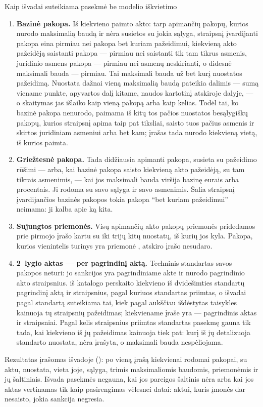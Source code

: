 \begin{codebox}{Kaip išvadai suteikiama pasekmė be modelio iškvietimo}
\begin{enumerate}
    tada, kai tas kitas aktas yra tarp aktų, kuriuos ši ataskaita vertina šiai įmonei. Iš kelių
    tokių aktų imamas tas, kurio maksimali bauda didžiausia.
  \item \textbf{Bazinė pakopa.} Iš kiekvieno paimto akto: tarp apimančių pakopų, kurios nurodo
    maksimalią baudą ir nėra susietos su jokia sąlyga, straipsnį įvardijanti pakopa eina pirmiau
    nei pakopa bet kuriam pažeidimui, kiekvieną akto pažeidėją saistanti pakopa --- pirmiau nei
    saistanti tik tam tikrus asmenis, juridinio asmens pakopa --- pirmiau nei asmenų neskirianti, o
    didesnė maksimali bauda --- pirmiau. Tai maksimali bauda už bet kurį nuostatos pažeidimą.
    Nuostata dažnai vieną maksimalią baudą pateikia dalimis --- sumą viename punkte, apyvartos
    dalį kitame, naudos kartotinį atskiroje dalyje, --- o skaitymas jas išlaiko kaip vieną
    pakopą arba kaip kelias. Todėl tai, ko bazinė pakopa nenurodo, paimama iš kitų tos pačios
    nuostatos besąlygiškų pakopų, kurios straipsnį apima taip pat tiksliai, saisto tuos pačius
    asmenis ir skirtos juridiniam asmeniui arba bet kam; įrašas tada nurodo kiekvieną vietą, iš
    kurios paimta.
  \item \textbf{Griežtesnė pakopa.} Tada didžiausia apimanti pakopa, susieta su pažeidimo
    rūšimi --- arba, kai bazinė pakopa saisto kiekvieną akto pažeidėją, su tam tikrais asmenimis,
    --- kai jos maksimali bauda viršija bazinę eurais arba procentais. Ji rodoma su savo sąlyga
    ir savo asmenimis. Šalia straipsnį įvardijančios bazinės pakopos tokia pakopa \enquote{bet
    kuriam pažeidimui} neimama: ji kalba apie ką kita.
  \item \textbf{Sujungtos priemonės.} Visų apimančių akto pakopų priemonės pridedamos prie
    pirmojo įrašo kartu su iki trijų kitų nuostatų, iš kurių jos kyla. Pakopa, kurios vienintelis
    turinys yra priemonė , atskiro įrašo nesudaro.
  \item \textbf{2~lygio aktas --- per pagrindinį aktą.} Techninis standartas savos pakopos
    neturi: jo sankcijos yra pagrindiniame akte ir nurodo pagrindinio akto straipsnius.
     iš katalogo perskaito kiekvieno iš dvidešimties standartų pagrindinį
    aktą ir straipsnius, pagal kuriuos standartas priimtas, o išvadai pagal standartą
    suteikiama tai, kiek pagal aukščiau išdėstytas taisykles kainuoja tų straipsnių pažeidimas;
    kiekviename įraše yra  --- pagrindinis aktas ir straipsniai. Pagal kelis
    straipsnius priimtas standartas pasekmę gauna tik tada, kai kiekvieno iš jų pažeidimas
    kainuoja tiek pat: kurį iš jų detalizuoja standarto nuostata, nėra įrašyta, o maksimali
    bauda nespėliojama.
\end{enumerate}
Rezultatas įrašomas išvadoje (): po vieną įrašą kiekvienai
rodomai pakopai, su aktu, nuostata, vieta joje, sąlyga, trimis maksimaliomis baudomis, priemonėmis
ir jų šaltiniais. Išvada pasekmės negauna, kai jos pareigos šaltinis nėra  arba kai
jos aktas vertinamas tik kaip pasirengimas vėlesnei datai: aktui, kuris įmonės dar nesaisto,
jokia sankcija negresia.
\end{codebox}

